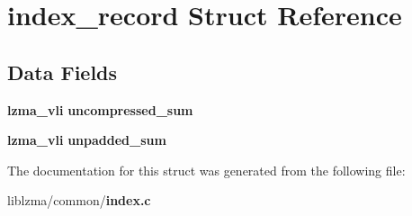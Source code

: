 \section{index\-\_\-record Struct Reference}
\label{structindex__record}
\subsection*{Data Fields}
\begin{DoxyCompactItemize}
\item 
{\bf lzma\-\_\-vli} {\bfseries uncompressed\-\_\-sum}\label{structindex__record_a70cd20a2469a9960854863541e656ca2}

\item 
{\bf lzma\-\_\-vli} {\bfseries unpadded\-\_\-sum}\label{structindex__record_a23f8fffcfc46cb2086e6fd3f635d73b7}

\end{DoxyCompactItemize}


The documentation for this struct was generated from the following file\-:\begin{DoxyCompactItemize}
\item 
liblzma/common/{\bf index.\-c}\end{DoxyCompactItemize}
